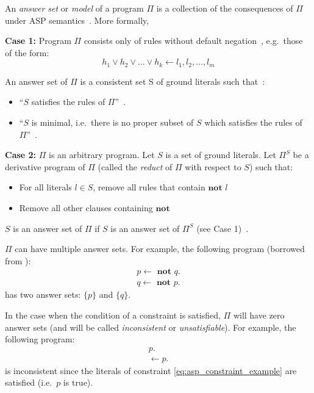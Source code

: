 \begin{definition}
    An \textit{answer set} or \textit{model} of a program $\Pi$ is a collection of the consequences of $\Pi$ under ASP semantics~\citep{balduccini_asp_2011}.
    More formally,

    \textbf{Case 1:} Program $\Pi$ consists only of rules without default negation~\citep{blount_architecture_2013}, e.g.~those of the form:
    \begin{equation}
        h_1 \lor h_2 \lor \dots \lor h_k \leftarrow l_1, l_2, \dots, l_m
    \end{equation}

    An answer set of $\Pi$ is a consistent set S of ground literals such that~\citep{blount_architecture_2013}:
    \begin{itemize}
        \item ``$S$ satisfies the rules of $\Pi$''~\citep{blount_architecture_2013}.
        \item ``$S$ is minimal, i.e.~there is no proper subset of $S$ which satisfies the rules of $\Pi$''~\citep{blount_architecture_2013}.
    \end{itemize}

    \textbf{Case 2:} $\Pi$ is an arbitrary program.
    Let $S$ is a set of ground literals.
    Let $\Pi^S$ be a derivative program of $\Pi$ (called the \textit{reduct} of $\Pi$ with respect to $S$) such that:
    \begin{itemize}
        \item For all literals $l \in S$, remove all rules that contain $\textbf{not } l$
        \item Remove all other clauses containing $\textbf{not}$
    \end{itemize}
    $S$ is an answer set of $\Pi$ if $S$ is an answer set of $\Pi^S$ (see Case 1)~\citep{blount_architecture_2013}.
\end{definition}

$\Pi$ can have multiple answer sets.
For example, the following program (borrowed from \citet{balduccini_asp_2011}):
\begin{gather}
    p \leftarrow \textbf{ not } q. \\
    q \leftarrow \textbf{ not } p.
\end{gather}
has two answer sets: $\{p\}$ and $\{q\}$.

In the case when the condition of a constraint is satisfied, $\Pi$ will have zero answer sets (and will be called \textit{inconsistent} or \textit{unsatisfiable}).
For example, the following program:
\begin{gather}
    p. \\
    \leftarrow p. \label{eq:asp_constraint_example}
\end{gather}
is inconsistent since the literals of constraint \ref{eq:asp_constraint_example} are satisfied (i.e.~$p$ is true).

